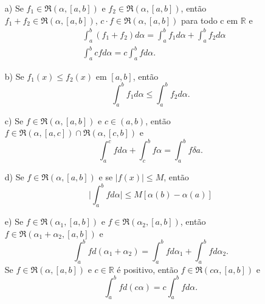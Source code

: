 \documentclass[analysis_notes.tex]{subfiles}
\begin{document}
\begin{theorem*}
	\begin{itemize}
		\item[a)] Se \(f_1\in \mathfrak{R}(\alpha , [a, b])\) e \(f_2\in \mathfrak{R}(\alpha , [a, b])\), então \(f_1 + f_2\in \mathfrak{R}(\alpha , [a, b])\),
		      \(c \cdot f\in \mathfrak{R}(\alpha , [a, b])\) para todo c em \(\mathbb{R}\) e
		      \begin{align*}
			       & \int_{a}^{b} (f_1 + f_2)d\alpha = \int_{a}^{b}f_1d\alpha + \int_{a}^{b}f_2d\alpha \\
			       & \int_{a}^{b}cfd\alpha = c \int_{a}^{b}fd\alpha .
		      \end{align*}
		\item[b)] Se \(f_{1}(x)\leq f_{2}(x)\) em \([a, b]\), então
		      \[
			      \int_{a}^{b}f_{1}d\alpha \leq \int_{a}^{b}f_{2}d\alpha .
		      \]
		\item[c)] Se \(f\in \mathfrak{R}(\alpha , [a, b])\) e \(c\in (a, b)\), então \(f\in \mathfrak{R}(\alpha , [a, c])\cap \mathfrak{R}(\alpha ,[c, b])\) e
		      \[
			      \int_{a}^{c}fd\alpha + \int_{c}^{b}f\alpha  = \int_{a}^{b}f\delta a.
		      \]
		\item[d)] Se \(f\in \mathfrak{R}(\alpha , [a, b])\) e se \(|f(x)|\leq M\), então
		      \[
			      \biggl\vert \int_{a}^{b}fd\alpha  \biggr\vert \leq  M[\alpha (b) - \alpha (a)]
		      \]
		\item[e)] Se \(f\in \mathfrak{R}(\alpha_1, [a, b])\) e \(f\in \mathfrak{R}(\alpha _2, [a, b])\), então \(f\in \mathfrak{R}(\alpha _1 + \alpha _2, [a, b])\) e
		      \[
			      \int_{a}^{b}fd(\alpha_1 + \alpha_2) = \int_{a}^{b}fd\alpha _1 + \int_{a}^{b}fd\alpha _2.
		      \]
		      Se \(f\in \mathfrak{R}(\alpha , [a,b])\) e \(c\in \mathbb{R}\) é positivo, então \(f\in \mathfrak{R}(c\alpha, [a, b] )\) e
		      \[
			      \int_{a}^{b}fd(c\alpha) = c \int_{a}^{b}fd\alpha .
		      \]
	\end{itemize}
\end{theorem*}
\end{document}
